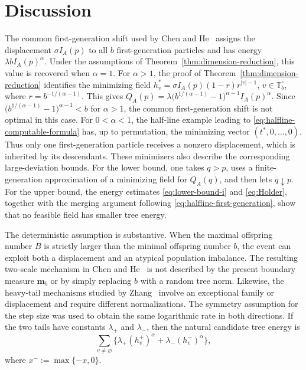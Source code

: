 \documentclass[a4paper, 11pt]{article}
\newcounter{assum}
\newcommand{\1}{\mathbf 1}
\theoremstyle{plain}
\begin{document}
\section{Discussion}\label{rgrthrt45vg}
The common first-generation shift used by Chen and
He~\cite[Section~4.1.3]{ChenHe2019} assigns the displacement
\(\sigma I_A(p)\) to all \(b\) first-generation particles and has energy
\(\lambda bI_A(p)^\alpha\). Under the assumptions of
Theorem~\ref{thm:dimension-reduction}, this value is recovered when
\(\alpha=1\). For \(\alpha>1\), the proof of
Theorem~\ref{thm:dimension-reduction} identifies the minimizing field
\(h_v^*=\sigma I_A(p)(1-r)r^{|v|-1}\), $v\in\mathbb{T}_b^\circ$, where
\(r=b^{-1/(\alpha-1)}\). This gives
\(\displaystyle
Q_A(p)=\lambda\bigl(b^{1/(\alpha-1)}-1\bigr)^{\alpha-1}
I_A(p)^\alpha
\).
Since
\(\bigl(b^{1/(\alpha-1)}-1\bigr)^{\alpha-1}<b\) for $\alpha>1$, the common
first-generation shift is not optimal in this case. For
\(0<\alpha<1\), the half-line example leading to
\eqref{eq:halfline-computable-formula} has, up to permutation, the
minimizing vector \((t^*,0,\ldots,0)\). Thus only one first-generation
particle receives a nonzero displacement, which is inherited by its
descendants. These minimizers also describe the corresponding
large-deviation bounds. For the lower bound, one takes \(q>p\), uses a
finite-generation approximation of a minimizing field for \(Q_A(q)\),
and then lets \(q\downarrow p\). For the upper bound, the energy estimates
\eqref{eq:lower-bound-i} and \eqref{eq:Holder}, together with the merging
argument following \eqref{eq:halfline-first-generation}, show that no
feasible field has smaller tree energy.
\par
The deterministic assumption is substantive. When the maximal offspring
number \(B\) is strictly larger than the minimal offspring number \(b\),
the event can exploit both a displacement and an atypical population
imbalance. The resulting two-scale mechanism in
Chen and He~\cite[Theorem 1.3]{ChenHe2019} is not described by the present boundary
measure $\mathbf m_b$ or by simply replacing \(b\) with a random tree norm. Likewise, the
heavy-tail mechanisms studied by Zhang~\cite{Zhang2022} involve an
exceptional family or displacement and require different normalizations. The symmetry assumption for the step size was used to obtain the same logarithmic rate in both directions. If the two tails have constants \(\lambda_+\) and \(\lambda_-\), then the natural
candidate tree energy is \[
  \sum_{v\neq\varnothing}
  \Big\{
    \lambda_+(h_v^+)^\alpha+
    \lambda_-(h_v^-)^\alpha
  \Big\},
\]
where $x^-:=\max\{-x,0\}$.
\end{document}
